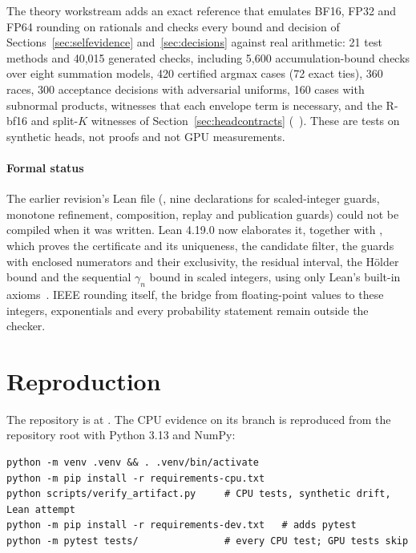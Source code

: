 The theory workstream adds an exact reference that emulates BF16, FP32 and FP64 rounding on rationals and checks every bound and decision of Sections~\ref{sec:selfevidence} and~\ref{sec:decisions} against real arithmetic: 21 test methods and 40,015 generated checks, including 5,600 accumulation-bound checks over eight summation models, 420 certified argmax cases (72 exact ties), 360 races, 300 acceptance decisions with adversarial uniforms, 160 cases with subnormal products, witnesses that each envelope term is necessary, and the R-bf16 and split-$K$ witnesses of Section~\ref{sec:headcontracts} (~). These are tests on synthetic heads, not proofs and not GPU measurements.

\paragraph{Formal status} The earlier revision's Lean file (, nine declarations for scaled-integer guards, monotone refinement, composition, replay and publication guards) could not be compiled when it was written. Lean 4.19.0 now elaborates it, together with , which proves the certificate and its uniqueness, the candidate filter, the guards with enclosed numerators and their exclusivity, the residual interval, the Hölder bound and the sequential $\gamma_n$ bound in scaled integers, using only Lean's built-in axioms~. IEEE rounding itself, the bridge from floating-point values to these integers, exponentials and every probability statement remain outside the checker.

\section{Reproduction}\label{app:repro}
The repository is at \repourl. The CPU evidence on its  branch is reproduced from the repository root with Python 3.13 and NumPy:
\par\noindent\begin{minipage}{\linewidth}
\begin{lstlisting}
python -m venv .venv && . .venv/bin/activate
python -m pip install -r requirements-cpu.txt
python scripts/verify_artifact.py     # CPU tests, synthetic drift, Lean attempt
python -m pip install -r requirements-dev.txt   # adds pytest
python -m pytest tests/               # every CPU test; GPU tests skip
\end{lstlisting}
\end{minipage}\par\smallskip

